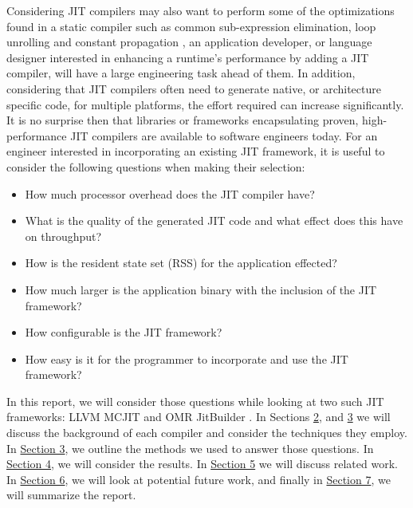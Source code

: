 Considering JIT compilers may also want to perform some of the optimizations found in a static compiler such as common sub-expression elimination, loop unrolling and constant propagation \cite{compilerBook}, an application developer, or language designer interested in enhancing a runtime's performance by adding a JIT compiler, will have a large engineering task ahead of them.
In addition, considering that JIT compilers often need to generate native, or architecture specific code, for multiple platforms, the effort required can increase significantly.
It is no surprise then that libraries or frameworks encapsulating proven, high-performance JIT compilers are available to software engineers today.
For an engineer interested in incorporating an existing JIT framework, it is useful to consider the following questions when making their selection: 
\begin{itemize}
    \item How much processor overhead does the JIT compiler have?
    \item What is the quality of the generated JIT code and what effect does this have on throughput?
    \item How is the resident state set (RSS) for the application effected?    
    \item How much larger is the application binary with the inclusion of the JIT framework?
    \item How configurable is the JIT framework?
    \item How easy is it for the programmer to incorporate and use the JIT framework?
\end{itemize} 

In this report, we will consider those questions while looking at two such JIT frameworks: LLVM MCJIT \cite{LLVM_Web} and OMR JitBuilder \cite{jitbuilderPaper}.
In Sections \hyperref[sec:llvm]{2}, and \hyperref[sec:jitbuilder]{3} we will discuss the background of each compiler and consider the techniques they employ.
In \hyperref[sec:methodology]{Section 3}, we outline the methods we used to answer those questions.
In \hyperref[sec:results]{Section 4}, we will consider the results.
In \hyperref[sec:related-work]{Section 5} we will discuss related work.
In \hyperref[sec:future-work]{Section 6}, we will look at potential future work, and finally in \hyperref[sec:summary]{Section 7}, we will summarize the report.